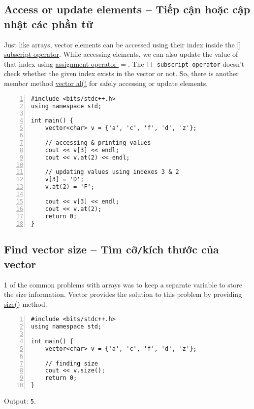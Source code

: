 \documentclass{article}
\begin{document}

\subsection{Access or update elements -- Tiếp cận hoặc cập nhật các phần tử}
Just like arrays, vector elements can be accessed using their index inside the \href{https://www.geeksforgeeks.org/vectoroperator-vectoroperator-c-stl/}{[] subscript operator}. While accessing elements, we can also update the value of that index using \href{https://www.geeksforgeeks.org/cpp-assignment-operators/}{assignment operator $=$}. The {\tt[] subscript operator} doesn't check whether the given index exists in the vector or not. So, there is another member method \href{https://www.geeksforgeeks.org/vector-at-in-cpp-stl/}{vector al()} for safely accessing or update elements.
\begin{Verbatim}[numbers=left,xleftmargin=5mm]
#include <bits/stdc++.h>
using namespace std;

int main() {
    vector<char> v = {'a', 'c', 'f', 'd', 'z'};
	
	// accessing & printing values
    cout << v[3] << endl;
    cout << v.at(2) << endl;
	
    // updating values using indexes 3 & 2
    v[3] = 'D';
    v.at(2) = 'F';
	
    cout << v[3] << endl;
    cout << v.at(2);
    return 0;
}
\end{Verbatim}


\subsection{Find vector size -- Tìm cỡ{\tt/}kích thước của vector}
1 of the common problems with arrays was to keep a separate variable to store the size information. Vector provides the solution to this problem by providing \href{https://www.geeksforgeeks.org/vector-size-in-cpp-stl/}{size()} method.
\begin{Verbatim}[numbers=left,xleftmargin=5mm]
#include <bits/stdc++.h>
using namespace std;

int main() {
    vector<char> v = {'a', 'c', 'f', 'd', 'z'};
	
    // finding size
    cout << v.size();
    return 0;
}
\end{Verbatim}
Output: {\tt5}.
\end{document}
